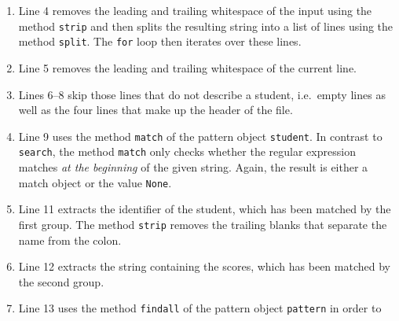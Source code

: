 \begin{enumerate}
\begin{enumerate}
\begin{enumerate}
                  Note that the hyphen has been escaped as ``\texttt{-}'', since inside a character
                  class an unescaped hyphen would be interpreted as the range operator that we have discussed in
                  the previous section.
            \item \texttt{:s*} matches the colon and the whitespace that separates the identifier
                  from the scores.
            \item \texttt{(.*)} is the second group.  It matches the remainder of the line, which
                  contains the scores.
            \end{enumerate}
      \item The regular expression \texttt{pattern} matches a natural number, i.e.\ either the digit
            \texttt{0} or a sequence of digits that does not start with the digit \texttt{0}.  It is used to
            extract the scores and it automatically ignores the hyphens that mark those exercises that have not
            been attempted.
      \end{enumerate}
\item Line 4 removes the leading and trailing whitespace of the input using the method \texttt{strip} and then
      splits the resulting string into a list of lines using the method \texttt{split}.  The \texttt{for} loop
      then iterates over these lines.
\item Line 5 removes the leading and trailing whitespace of the current line.
\item Lines 6--8 skip those lines that do not describe a student, i.e.\ empty lines as well as the four lines
      that make up the header of the file.
\item Line 9 uses the method \texttt{match} of the pattern object
      \texttt{student}.  In contrast to \texttt{search}, the method \texttt{match} only checks whether
      the regular expression matches \emph{at the beginning} of the given string.  Again, the result is either a
      match object or the value \texttt{None}.
\item Line 11 extracts the identifier of the student, which has been matched by the first group.  The method
      \texttt{strip} removes the trailing blanks that separate the name from the colon.
\item Line 12 extracts the string containing the scores, which has been matched by the second group.
\item Line 13 uses the method \texttt{findall} of the pattern object \texttt{pattern} in order to

\end{enumerate}
